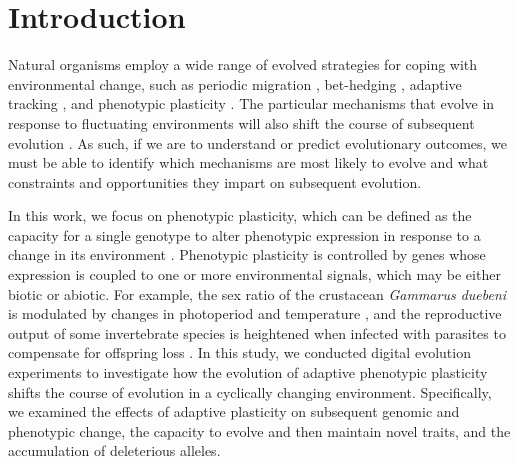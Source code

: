 
\section{Introduction}

Natural organisms employ a wide range of evolved strategies for coping with environmental change, such as 
periodic migration \citep{winger_long_2019}, 
bet-hedging \citep{beaumont_experimental_2009}, 
adaptive tracking \citep{barrett_adaptation_2008},
and phenotypic plasticity \citep{ghalambor_adaptive_2007}.
The particular mechanisms that evolve in response to fluctuating environments will also shift the course of subsequent evolution \citep{wennersten_population-level_2012,schaum_plasticity_2014}.
As such, if we are to understand or predict evolutionary outcomes, we must be able to identify which mechanisms are most likely to evolve and what constraints and opportunities they impart on subsequent evolution.

In this work, we focus on phenotypic plasticity, which can be defined as the capacity for a single genotype to alter phenotypic expression in response to a change in its environment \citep{west-eberhard_developmental_2003}. 
Phenotypic plasticity is controlled by genes whose expression is coupled to one or more environmental signals, which may be either biotic or abiotic. 
For example, the sex ratio of the crustacean \textit{Gammarus duebeni} is modulated by changes in photoperiod and temperature \citep{dunn_two_2005}, and the reproductive output of some invertebrate species is heightened when infected with parasites to compensate for offspring loss \citep{chadwick_parasite-mediated_2005}. 
In this study, we conducted digital evolution experiments to investigate how the evolution of adaptive phenotypic plasticity shifts the course of evolution in a cyclically changing environment.
Specifically, we examined the effects of adaptive plasticity on subsequent genomic and phenotypic change, the capacity to evolve and then maintain novel traits, and the accumulation of deleterious alleles.


